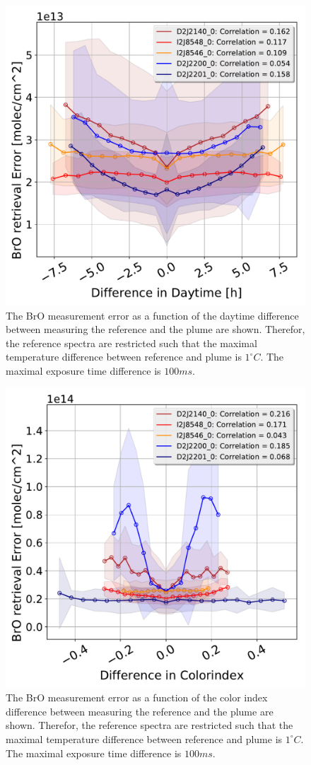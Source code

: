 \documentclass  [
  paper    = a4,
  BCOR     = 10mm,
  twoside,
  fontsize = 12pt,
  fleqn,
  toc      = bibnumbered,
  toc      = listofnumbered,
  numbers  = noendperiod,
  headings = normal,
  listof   = leveldown,
  version  = 3.03
]                                       {scrreprt}
\begin{document}
\begin{figure}[h]
	\centering
	\includegraphics[width=0.5\linewidth]{Bilder/BrOErr_OhnEVar/DiffDaytimewithoutOtherparamallInstruments}
	\caption{The BrO measurement error as a function of the daytime difference between measuring the reference and the plume are shown. Therefor, the reference spectra are restricted such that the maximal temperature difference between reference and plume is $1^\circ C$. The maximal exposure time difference is $100 ms$.
	}
	\label{fig:diffdaytimewithoutotherparamallinstruments}
\end{figure}
\begin{figure}[h]
	\centering
	\includegraphics[width=0.5\linewidth]{Bilder/BrOErr_OhnEVar/DiffColidxwithoutOtherparamallInstruments}
	\caption{The BrO measurement error as a function of the color index difference between measuring the reference and the plume are shown. Therefor, the reference spectra are restricted such that the maximal temperature difference between reference and plume is $1^\circ C$. The maximal exposure time difference is $100 ms$.}
	\label{fig:diffcolidxwithoutotherparamallinstruments}
\end{figure}
\end{document}

